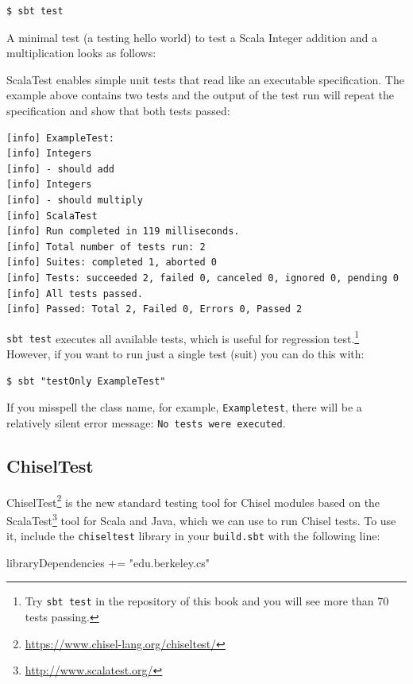\documentclass[%
    10pt,
    headinclude, footexclude,
    openright, %
    notitlepage,
    cleardoubleempty,
    headsepline,
    pointlessnumbers,
    bibtotoc, idxtotoc,
    ]{scrbook}
\newcommand{\code}[1]{{\small{\texttt{#1}}}}
\newcommand{\codefoot}[1]{{\footnotesize{\texttt{#1}}}}
\newcommand{\myref}[2]{\href{#1}{#2}}
\renewcommand{\myref}[2]{{#2}{\footnote{\url{#1}}}}
\begin{document}
\begin{verbatim}
$ sbt test
\end{verbatim}

\noindent A minimal test (a testing hello world) to test a Scala Integer
addition and a multiplication looks as follows:


ScalaTest enables simple unit tests that read like an executable specification.
The example above contains two tests and the output of the test run will repeat the specification
and show that both tests passed:

\begin{verbatim}
[info] ExampleTest:
[info] Integers
[info] - should add
[info] Integers
[info] - should multiply
[info] ScalaTest
[info] Run completed in 119 milliseconds.
[info] Total number of tests run: 2
[info] Suites: completed 1, aborted 0
[info] Tests: succeeded 2, failed 0, canceled 0, ignored 0, pending 0
[info] All tests passed.
[info] Passed: Total 2, Failed 0, Errors 0, Passed 2
\end{verbatim}


\code{sbt test} executes all available tests, which is useful for regression
test.\footnote{Try \codefoot{sbt test} in the repository of this book and you
will see more than 70 tests passing.}
However, if you want to run just a single test (suit) you can do this with:

\begin{verbatim}
$ sbt "testOnly ExampleTest"
\end{verbatim}

\noindent If you misspell the class name, for example, \code{Exampletest},
there will be a relatively silent error message: \code{No tests were executed}.

\subsection{ChiselTest}


\myref{https://www.chisel-lang.org/chiseltest/}{ChiselTest} is the new standard testing tool 
for Chisel modules based on the \myref{http://www.scalatest.org/}{ScalaTest} tool for Scala 
and Java, which we can use to run Chisel tests.
To use it, include the \code{chiseltest} library in your \code{build.sbt} with the following line:

\begin{chisel}
libraryDependencies += "edu.berkeley.cs" %
\end{chisel}
\end{document}
